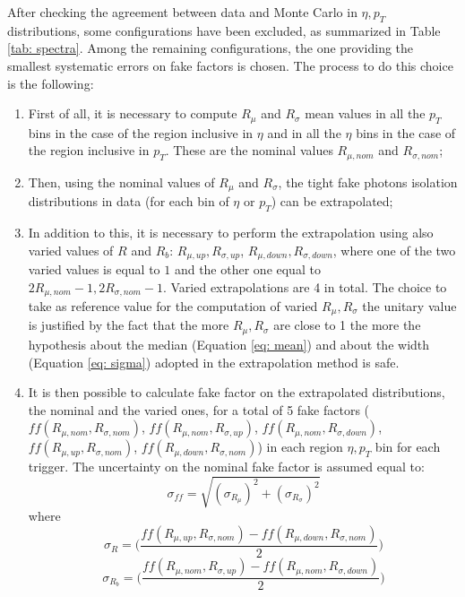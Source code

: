 After checking the agreement between data and Monte Carlo in $\eta, p_T$ distributions, some configurations have been excluded, as summarized in Table \ref{tab: spectra}. Among the remaining configurations, the one providing the smallest systematic errors on fake factors is chosen. The process to do this choice is the following: 
\begin{enumerate}
    \item First of all, it is necessary to compute $R_\mu$ and $R_\sigma$ mean values in all the $p_T$ bins in the case of the region inclusive in $\eta$ and in all the $\eta$ bins in the case of the region inclusive in $p_T$. These are the nominal values $R_{\mu, nom}$ and $ R_{\sigma, nom}$;
    
    \item Then, using the nominal values of $R_\mu$ and $R_\sigma$, the tight fake photons isolation distributions in data (for each bin of $\eta$ or $p_T$) can be extrapolated; 
    \item In addition to this, it is necessary to perform the extrapolation using also varied values of $R$ and $R_b$: $R_{\mu, up}, R_{\sigma, up}$, $R_{\mu, down}, R_{\sigma, down}$, where one of the two varied values is equal to $1$ and the other one equal to $2R_{\mu, nom}-1, 2R_{\sigma, nom}-1$. Varied extrapolations are 4 in total. 
    The choice to take as reference value for the computation of varied $R_\mu, R_\sigma$ the unitary value is justified by the fact that the more $R_\mu, R_\sigma$ are close to 1 the more the hypothesis about the median (Equation \ref{eq: mean}) and about the width (Equation \ref{eq: sigma}) adopted in the extrapolation method is safe. 
    \item It is then possible to calculate fake factor on the extrapolated distributions, the nominal and the varied ones, for a total of 5 fake factors ($ff(R_{\mu, nom},R_{\sigma, nom})$, $ff(R_{\mu, nom},R_{\sigma, up})$, $ff(R_{\mu, nom},R_{\sigma, down})$, $ff(R_{\mu, up},R_{\sigma, nom})$, $ff(R_{\mu, down},R_{\sigma, nom})$) in each region $\eta, p_T$ bin for each trigger. The uncertainty on the nominal fake factor is assumed equal to: 
    \begin{equation}
         \sigma_{ff} = \sqrt{(\sigma_{R_\mu})^2+(\sigma_{R_\sigma})^2}
    \end{equation}
    where 
       \begin{equation}
         \sigma_{R} = \Biggl(\frac{ff(R_{\mu, up},R_{\sigma, nom})-ff(R_{\mu, down},R_{\sigma, nom})}{2}\Biggr)
    \end{equation}
       \begin{equation}
         \sigma_{R_b} = \Biggl(\frac{ff(R_{\mu, nom},R_{\sigma, up})-ff(R_{\mu, nom},R_{\sigma, down})}{2}\Biggr)
    \end{equation}
\end{enumerate}

